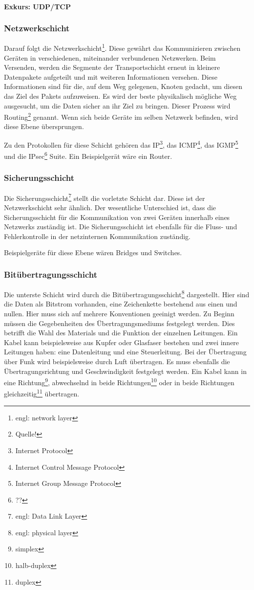 \documentclass[12pt]{article}
\begin{document}
\paragraph{Exkurs: UDP/TCP}
   
   
\subsubsection{Netzwerkschicht}
	Darauf folgt die Netzwerkschicht\footnote{engl: network layer}. Diese gewährt das Kommunizieren zwischen Geräten in verschiedenen, miteinander verbundenen Netzwerken. Beim Versenden, werden die Segmente der Transportschicht erneut in kleinere Datenpakete aufgeteilt und mit weiteren Informationen versehen. Diese Informationen sind für die, auf dem Weg gelegenen, Knoten gedacht, um diesen das Ziel des Pakets aufzuweisen. Es wird der beste physikalisch mögliche Weg ausgesucht, um die Daten sicher an ihr Ziel zu bringen. Dieser Prozess wird Routing\footnote{Quelle!} genannt.
	Wenn sich beide Geräte im selben Netzwerk befinden, wird diese Ebene übersprungen. 
	
	Zu den Protokollen für diese Schicht gehören das IP\footnote{Internet Protocol}, das ICMP\footnote{Internet Control Message Protocol}, das IGMP\footnote{Internet Group Message Protocol} und die IPsec\footnote{??} Suite. Ein Beispielgerät wäre ein Router.
	
\subsubsection{Sicherungsschicht}
	Die Sicherungsschicht\footnote{engl: Data Link Layer} stellt die vorletzte Schicht dar. Diese ist der Netzwerkschicht sehr ähnlich. Der wesentliche Unterschied ist, dass die Sicherungsschicht für die Kommunikation von zwei Geräten innerhalb eines Netzwerks zuständig ist. Die Sicherungsschicht ist ebenfalls für die Fluss- und Fehlerkontrolle in der netzinternen Kommunikation zuständig. 
	
	Beispielgeräte für diese Ebene wären Bridges und Switches.

\subsubsection{Bitübertragungsschicht}
	Die unterste Schicht wird durch die Bitübertragungsschicht\footnote{engl: physical layer} dargestellt. Hier sind die Daten als Bitstrom vorhanden, eine Zeichenkette bestehend aus einen und nullen. Hier muss sich auf mehrere Konventionen geeinigt werden. Zu Beginn müssen die Gegebenheiten des Übertragungsmediums festgelegt werden. Dies betrifft die Wahl des Materials und die Funktion der einzelnen Leitungen. Ein Kabel kann beispielsweise aus Kupfer oder Glasfaser bestehen und zwei innere Leitungen haben: eine Datenleitung und eine Steuerleitung. Bei der Übertragung über Funk wird beispielsweise durch Luft übertragen. Es muss ebenfalls die Übertragungsrichtung und Geschwindigkeit festgelegt werden. Ein Kabel kann in eine Richtung\footnote{simplex}, abwechselnd in beide Richtungen\footnote{halb-duplex} oder in beide Richtungen gleichzeitig\footnote{duplex} übertragen.
\end{document}
